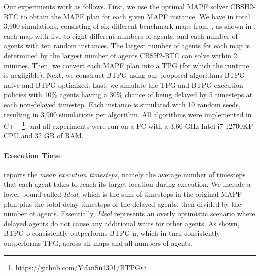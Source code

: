 \documentclass[letterpaper]{article} %
\theoremstyle{definition}
\begin{document}
Our experiments work as follows. First, we use the optimal MAPF solver CBSH2-RTC \cite{li_pairwise_2021} to obtain the MAPF plan for each given MAPF instance. We have in total 3,900 simulations, consisting of six different benchmark maps from~\cite{stern_multi-agent_2021}, as shown in , each map with five to eight different numbers of agents, and each number of agents with ten random instances. The largest number of agents for each map is determined by the largest number of agents CBSH2-RTC can solve within 2 minutes.
Then, we convert each MAPF plan into a TPG (for which the runtime is negligible).
Next, we construct BTPG using our proposed algorithms BTPG-naive and BTPG-optimized. Last, we simulate the TPG and BTPG execution policies with 10\% agents having a 30\% chance of being delayed by 5 timesteps at each non-delayed timestep. Each instance is simulated with 10 random seeds, resulting in 3,900 simulations per algorithm.
All algorithms were implemented in C++ \footnote{https://github.com/YifanSu1301/BTPG}, and all experiments were run on a PC with a 3.60 GHz Intel i7-12700KF CPU and 32 GB of RAM.


\paragraph{Execution Time}  reports the \emph{mean execution timesteps}, namely the average number of timesteps that each agent takes to reach its target location during execution. We include a lower bound called \emph{Ideal}, which is the sum of timesteps in the original MAPF plan plus the total delay timesteps of the delayed agents, then divided by the number of agents. Essentially, \emph{Ideal} represents an overly optimistic scenario where delayed agents do not cause any additional waits for other agents. As shown, BTPG-o consistently outperforms BTPG-n, which in turn consistently outperforms TPG, across all maps and all numbers of agents.
\end{document}
